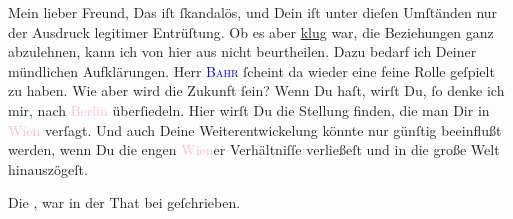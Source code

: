 \pstart\center{}Mein lieber Freund,\pend
\pstart
           Das \label{K_L03095-1v}\label{K_L03095-1h} iſt ſkandalös, und Dein
                  \label{K_L03095-22v}\label{K_L03095-22h} iſt unter dieſen Umſtänden nur der Ausdruck legitimer Entrüſtung. Ob es aber
                  \uline{klug} war, die Beziehungen ganz abzulehnen, kann
               ich von hier aus nicht beurtheilen. Dazu bedarf ich Deiner mündlichen Aufklärungen.
               Herr \textsc{\textcolor{blue}{Bahr}{}\ledrightnote{\textcolor{blue}{Hermann Bahr}}} ſcheint da wieder eine feine Rolle geſpielt zu haben. Wie aber wird die Zukunft
               ſein? Wenn Du \label{K_L03095-2v}\label{K_L03095-2h} haſt, wirſt Du, ſo denke
               ich mir, nach \textcolor{pink}{Berlin}{}\ledrightnote{\textcolor{pink}{Berlin}} überſiedeln. Hier wirſt Du
               die Stellung finden, die man Dir in \textcolor{pink}{Wien}{}\ledrightnote{\textcolor{pink}{Wien}} verſagt.
               Und {\pb}auch \strikeout{\textcolor{gray}{h}\textcolor{gray}{×}} Deine Weiterentwickelung könnte nur günſtig  beeinflußt werden, wenn Du die engen \textcolor{pink}{Wien}{}\ledrightnote{\textcolor{pink}{Wien}}er Verhältniſſe verließeſt und in die große Welt hinauszögeſt.\pend
           
\pstart
           Die \label{K_L03095-87v}\label{K_L03095-87h}, war in der That bei \label{K_L03095-67v}\label{K_L03095-67h} geſchrieben.\pend
           
